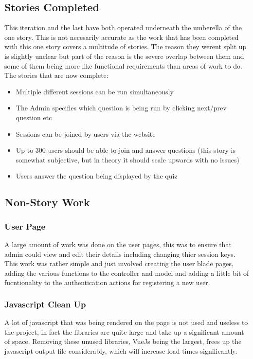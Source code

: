 \subsection{Stories Completed}
This iteration and the last have both operated underneath the umberella of the one story. This is not necesarily accurate as the work that has been completed with this one story covers a multitude of stories. The reason they werent split up is slightly unclear but part of the reason is the severe overlap between them and some of them being more like functional requirements than areas of work to do. The stories that are now complete:
\begin{itemize}
	\item Multiple different sessions can be run simultaneously
	\item The Admin specifies which question is being run by clicking next/prev question etc
	\item Sessions can be joined by users via the website
	\item Up to 300 users should be able to join and answer questions (this story is somewhat subjective, but in theory it should scale upwards with no issues)
	\item Users answer the question being displayed by the quiz
\end{itemize}
\newpage

\subsection{Non-Story Work}
\subsubsection{User Page}
A large amount of work was done on the user pages, this was to ensure that admin could view and edit their details including changing thier session keys. This work was rather simple and just involved creating the user blade pages, adding the various functions to the controller and model and adding a little bit of fucntionality to the authentication actions for registering a new user.
\subsubsection{Javascript Clean Up}
A lot of javascript that was being rendered on the page is not used and useless to the project, in fact the libraries are quite large and take up a significant amount of space. Removing these unused libraries, VueJs being the largest, frees up the javascript output file considerably, which will increase load times significantly.
\newpage
